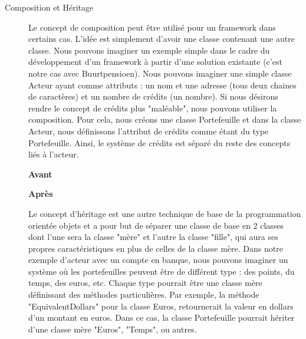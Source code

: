 \begin{description}

\item[Composition et Héritage]
Le concept de composition peut être utilisé pour un framework dans certains cas.  L'idée est simplement d'avoir une classe contenant une autre classe.  Nous pouvons imaginer un exemple simple dans le cadre du développement d'un framework à partir d'une solution existante (c'est notre cas avec Buurtpensioen).  Nous pouvons imaginer une simple classe Acteur ayant comme attributs : un nom et  une adresse (tous deux chaines de caractères) et un nombre de crédits (un nombre).  Si nous désirons rendre le concept de crédits plus "maléable",  nous pouvons utiliser la composition.  Pour cela,  nous créons une classe Portefeuille et dans la classe Acteur,  nous définissons l'attribut de crédits comme étant du type Portefeuille.  Ainsi,  le système de crédits est séparé du reste des concepts liés à l'acteur.  

\begin{minipage}{.5\textwidth}
\begin{center} \textbf{Avant}

\end{center}
\end{minipage}
\hspace{0.3cm}
\begin{minipage}{.5\textwidth}
\begin{center} \textbf{Après}\end{center}


\end{minipage}
\vspace{0.3cm}

Le concept d'héritage est une autre technique de base de la programmation orientée objets et a pour but de séparer une classe de base en 2 classes dont l'une sera la classe "mère" et l'autre la classe "fille",  qui aura ses propres caractéristiques en plus de celles de la classe mère.  Dans notre exemple d'acteur avec un compte en banque,  nous pouvons imaginer un système où les portefeuilles peuvent être de différent type : des points,  du temps,  des euros,  etc.  Chaque type pourrait être une classe mère définissant des méthodes particulières.  Par exemple,  la méthode "EquivalentDollars" pour la classe Euros,  retournerait la valeur en dollars d'un montant en euros.  Dans ce cas,  la classe Portefeuille pourrait hériter d'une classe mère "Euros",  "Temps",  ou autres.   


\end{description}
